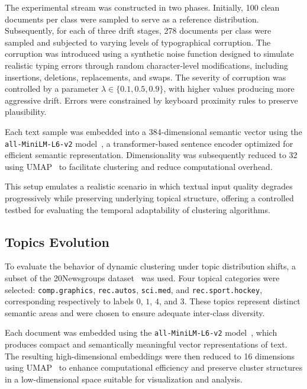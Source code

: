 The experimental stream was constructed in two phases. Initially, 100 clean
documents per class were sampled to serve as a reference distribution.
Subsequently, for each of three drift stages, 278 documents per class were
sampled and subjected to varying levels of typographical corruption. The
corruption was introduced using a synthetic noise function designed to simulate
realistic typing errors through random character-level modifications, including
insertions, deletions, replacements, and swaps. The severity of corruption was
controlled by a parameter $\lambda \in \{0.1, 0.5, 0.9\}$, with higher values
producing more aggressive drift. Errors were constrained by keyboard proximity
rules to preserve plausibility.

Each text sample was embedded into a 384-dimensional semantic vector using the
\texttt{all\allowbreak-MiniLM\allowbreak-L6\allowbreak-v2}
model~\cite{sentence-transformers}, a transformer-based sentence encoder
optimized for efficient semantic representation. Dimensionality was
subsequently reduced to 32 using UMAP~\cite{umap} to facilitate clustering and
reduce computational overhead.

This setup emulates a realistic scenario in which textual input quality
degrades progressively while preserving underlying topical structure, offering
a controlled testbed for evaluating the temporal adaptability of clustering
algorithms.

\subsection{Topics Evolution}\label{subsec:topics_evolution}

To evaluate the behavior of dynamic clustering under topic distribution shifts,
a subset of the 20Newsgroups dataset~\cite{20newsgroups} was used. Four topical
categories were selected: \texttt{comp.graphics}, \texttt{rec.autos},
\texttt{sci.med}, and \texttt{rec.sport.hockey}, corresponding respectively to
labels $0$, $1$, $4$, and $3$. These topics represent distinct semantic areas
and were chosen to ensure adequate inter-class diversity.

Each document was embedded using the
\texttt{all\allowbreak-MiniLM\allowbreak-L6\allowbreak-v2}
model~\cite{sentence-transformers}, which produces compact and semantically
meaningful vector representations of text. The resulting high-dimensional
embeddings were then reduced to 16 dimensions using UMAP~\cite{umap} to enhance
computational efficiency and preserve cluster structures in a low-dimensional
space suitable for visualization and analysis.

